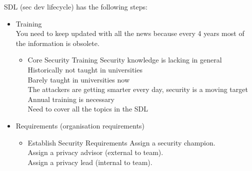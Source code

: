 \documentclass[10pt,a4paper]{article}
\begin{document}
SDL (sec dev lifecycle) has the following steps:
\begin{itemize}
\item Training \\
You need to keep updated with all the news because every 4 years most of the information is obsolete.
\begin{itemize}
\item Core Security Training
Security knowledge is lacking in general\\
Historically not taught in universities\\
Barely taught in universities now\\
The attackers are getting smarter every day, security is a
moving target\\
Annual training is necessary\\
Need to cover all the topics in the SDL\\

\end{itemize}
\item Requirements (organisation requirements)
\begin{itemize}
\item Establish Security Requirements
Assign a security champion.\\
Assign a privacy advisor (external to team).\\
Assign a privacy lead (internal to team).\\


\end{itemize}
\end{itemize}
\end{document}
